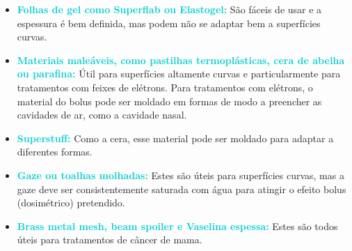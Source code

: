 \documentclass[11pt,a4paper]{article}
\begin{document}
	\begin{itemize}[label=\textcolor{CarnationPink}{$\blacksquare$}]
		\item \textcolor{DarkTurquoise}{\textbf{Folhas de gel como Superflab ou Elastogel:}} São fáceis de usar e a espessura é bem definida, mas podem não se adaptar bem a superfícies curvas.
		
		\item \textcolor{DarkTurquoise}{\textbf{Materiais maleáveis, como pastilhas termoplásticas, cera de abelha ou parafina:}} Útil para superfícies altamente curvas e particularmente para tratamentos com feixes de elétrons. Para tratamentos com elétrons, o material do bolus pode ser moldado em formas de modo a preencher as cavidades de ar, como a cavidade nasal.
		
		\item \textcolor{DarkTurquoise}{\textbf{Superstuff:}} Como a cera, esse material pode ser moldado para adaptar a diferentes formas.
		
		\item \textcolor{DarkTurquoise}{\textbf{Gaze ou toalhas molhadas:}} Estes são úteis para superfícies curvas, mas a gaze deve ser consistentemente saturada com água para atingir o efeito bolus (dosimétrico) pretendido.
		
		\item \textcolor{DarkTurquoise}{\textbf{Brass metal mesh\cite{healy2013skin}, beam spoiler e Vaselina espessa:}} Estes são todos úteis para tratamentos de câncer de mama.
	\end{itemize}
\end{document}
